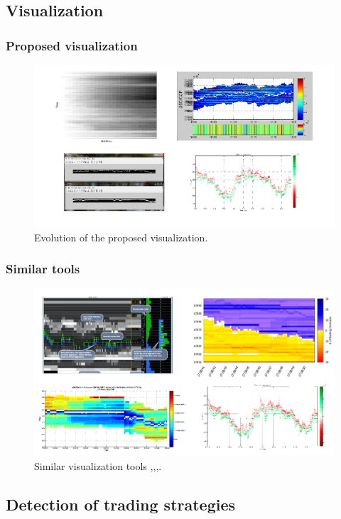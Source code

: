 \documentclass{beamer}
\begin{document}
\subsection{Visualization}
\begin{frame}
\frametitle{Proposed visualization}
\begin{figure}
	\centering
		\includegraphics[scale=0.3]{Visualization1.png}
	\caption{Evolution of the proposed visualization.}
	\label{fig:Visualization1}
\end{figure}
\end{frame}

\begin{frame}
\frametitle{Similar tools}
\begin{figure}
	\centering
		\includegraphics[scale=0.4]{SimilarVisualizations.png}
	\caption{Similar visualization tools \cite{BookMap15},\cite{Todd},\cite{chris13},\cite{cruz}.}
	\label{fig:Visualization1}
\end{figure}
\end{frame}

\subsection{Detection of trading strategies}
\end{document}
